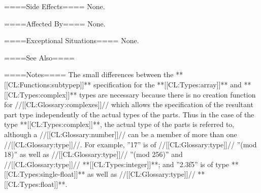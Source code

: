 ====Side Effects====
None.

====Affected By====
None.

====Exceptional Situations====
None.

====See Also====
{\secref\Types}

====Notes====
The small differences between the **[[CL:Functions:subtypep]]** specification for the **[[CL:Types:array]]** and **[[CL:Types:complex]]** types are necessary because there is no creation function for //[[CL:Glossary:complexes]]// which allows the specification of the resultant part type independently of the actual types of the parts. Thus in the case of the type **[[CL:Types:complex]]**, the actual type of the parts is referred to, although a //[[CL:Glossary:number]]// can be a member of more than one //[[CL:Glossary:type]]//. For example, ''17'' is of //[[CL:Glossary:type]]// ''(mod 18)'' as well as //[[CL:Glossary:type]]// ''(mod 256)'' and //[[CL:Glossary:type]]// **[[CL:Types:integer]]**; and ''2.3f5'' is of type **[[CL:Types:single-float]]** as well as //[[CL:Glossary:type]]// **[[CL:Types:float]]**.



    
